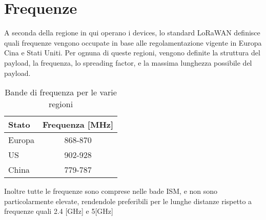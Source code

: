 \section{Frequenze}
A seconda della regione in qui operano i devices, lo standard LoRaWAN definisce
 quali frequenze vengono occupate in base alle regolamentazione vigente in
Europa Cina e Stati Uniti.  Per ognuna di queste regioni, vengono definite 
la struttura del payload, la frequenza, lo spreading factor, e la massima
lunghezza possibile del payload.
\begin{table}[h]
        \centering
        \begin{tabular}{l|c}
                \toprule
                Stato   & Frequenza [MHz] \\
                \hline
                Europa  & 868-870 \\
                US      & 902-928 \\
                China   & 779-787 \\
                \bottomrule
        \end{tabular}
        \caption{Bande di frequenza per le varie regioni}
\end{table}
Inoltre tutte le frequenze sono comprese nelle bade ISM, e non sono
particolarmente elevate, rendendole preferibili per le lunghe distanze rispetto
a frequenze quali 2.4 [GHz] e 5[GHz]
